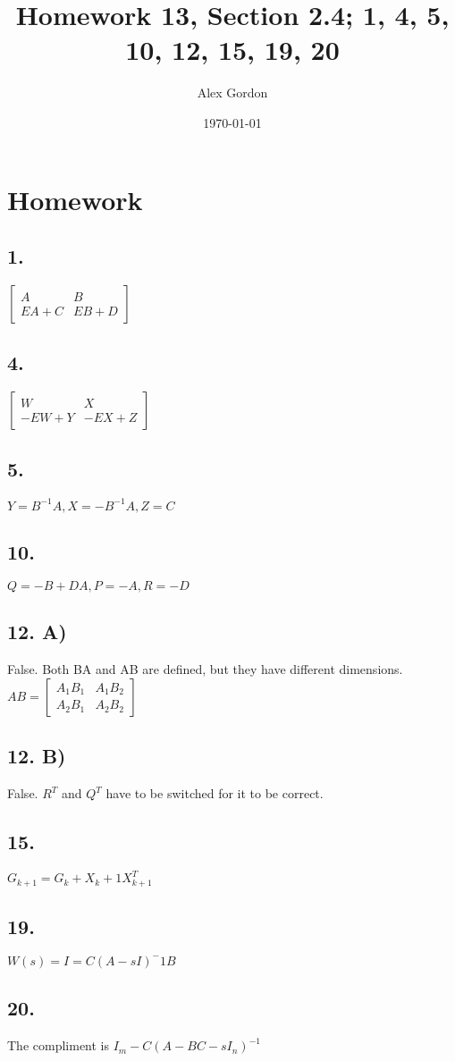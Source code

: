 \documentclass[12]{scrartcl}
\begin{document}
\title{Homework 13, Section 2.4; 1, 4, 5, 10, 12, 15, 19, 20}
\author{Alex Gordon}
\date{\today}
\maketitle
\section*{Homework}
\subsection*{1.}
$ \begin{bmatrix} A & B \\ EA + C & EB + D   \end{bmatrix}$
\subsection*{4.}
$ \begin{bmatrix} W& X \\ -EW + Y& -EX + Z   \end{bmatrix}$
\subsection*{5.}
$Y = B^{-1}A, X = -B^{-1}A,  Z = C$
\subsection*{10.}
$Q = -B + DA, P = -A, R = -D$
\subsection*{12. A)}
False. Both BA and AB are defined, but they have different dimensions. $AB = \begin{bmatrix} A_1B_1& A_1B_2 \\ A_2B_1 & A_2B_2   \end{bmatrix}$ 
\subsection*{12. B)}
False. $R^T$ and $Q^T$ have to be switched for it to be correct. 
\subsection*{15.}
$G_{k+1} = G_k + X_k + 1 X^{T}_{k+1}$
\subsection*{19.}
$W(s) = I = C(A - sI)^-1 B$
\subsection*{20.}
The compliment is $I_m - C(A - BC - sI_n)^{-1}$
\end{document}
